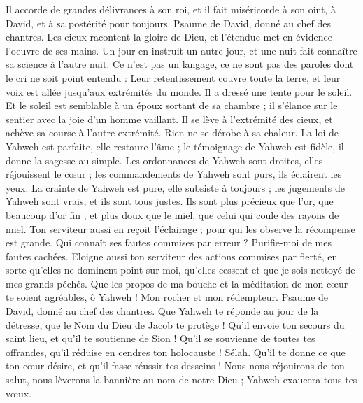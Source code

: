 \begin{multicols}{2}
Il accorde de grandes délivrances à son roi, et il fait miséricorde à son oint, à David, et à sa postérité pour toujours.
\VerseOne{}Psaume de David, donné au chef des chantres.
Les cieux racontent la gloire de Dieu, et l'étendue met en évidence l'oeuvre de ses mains.
Un jour en instruit un autre jour, et une nuit fait connaître sa science à l'autre nuit.
Ce n'est pas un langage, ce ne sont pas des paroles dont le cri ne soit point entendu :
Leur retentissement couvre toute la terre, et leur voix est allée jusqu'aux extrémités du monde. Il a dressé une tente pour le soleil.
Et le soleil est semblable à un époux sortant de sa chambre ; il s'élance sur le sentier avec la joie d'un homme vaillant.
Il se lève à l'extrémité des cieux, et achève sa course à l'autre extrémité. Rien ne se dérobe à sa chaleur.
La loi de Yahweh est parfaite, elle restaure l'âme ; le témoignage de Yahweh est fidèle, il donne la sagesse au simple.
Les ordonnances de Yahweh sont droites, elles réjouissent le cœur ; les commandements de Yahweh sont purs, ils éclairent les yeux.
La crainte de Yahweh est pure, elle subsiste à toujours ; les jugements de Yahweh sont vrais, et ils sont tous justes.
Ils sont plus précieux que l'or, que beaucoup d'or fin ; et plus doux que le miel, que celui qui coule des rayons de miel.
Ton serviteur aussi en reçoit l'éclairage ; pour qui les observe la récompense est grande.
Qui connaît ses fautes commises par erreur ? Purifie-moi de mes fautes cachées.
Eloigne aussi ton serviteur des actions commises par fierté, en sorte qu'elles ne dominent point sur moi, qu'elles cessent et que je sois nettoyé de mes grands péchés.
Que les propos de ma bouche et la méditation de mon cœur te soient agréables, ô Yahweh ! Mon rocher et mon rédempteur.
\VerseOne{}Psaume de David, donné au chef des chantres.
Que Yahweh te réponde au jour de la détresse, que le Nom du Dieu de Jacob te protège !
Qu'il envoie ton secours du saint lieu, et qu'il te soutienne de Sion !
Qu'il se souvienne de toutes tes offrandes, qu'il réduise en cendres ton holocauste ! Sélah.
Qu'il te donne ce que ton cœur désire, et qu'il fasse réussir tes desseins !
Nous nous réjouirons de ton salut, nous lèverons la bannière au nom de notre Dieu ; Yahweh exaucera tous tes vœux.

\end{multicols}
